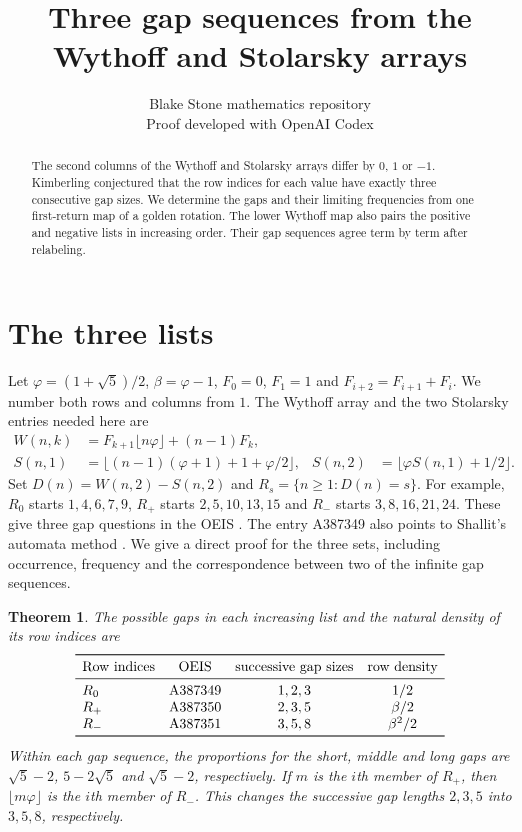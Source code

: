 \documentclass[11pt]{article}
\title{Three gap sequences from the Wythoff and Stolarsky arrays}
\author{Blake Stone mathematics repository\\[-2pt]\small Proof developed with OpenAI Codex}
\date{}
\newtheorem{theorem}{Theorem}
\newcommand{\ph}{\varphi}
\newcommand{\fl}[1]{\lfloor #1\rfloor}
\begin{document}
\maketitle
\begin{abstract}
The second columns of the Wythoff and Stolarsky arrays differ by $0$, $1$ or $-1$.
Kimberling conjectured that the row indices for each value have exactly three
consecutive gap sizes. We determine the gaps and their limiting frequencies
from one first-return map of a golden rotation. The lower Wythoff map also
pairs the positive and negative lists in increasing order. Their gap
sequences agree term by term after relabeling.
\end{abstract}

\section{The three lists}
Let $\ph=(1+\sqrt5)/2$, $\beta=\ph-1$, $F_0=0$, $F_1=1$ and
$F_{i+2}=F_{i+1}+F_i$. We number both rows and columns from $1$.
The Wythoff array and the two Stolarsky entries needed here are
\begin{align*}
 W(n,k)&=F_{k+1}\fl{n\ph}+(n-1)F_k,\\
 S(n,1)&=\fl{(n-1)(\ph+1)+1+\ph/2},&
 S(n,2)&=\fl{\ph S(n,1)+1/2}.
\end{align*}
Set $D(n)=W(n,2)-S(n,2)$ and $R_s=\{n\ge1:D(n)=s\}$.
For example, $R_0$ starts $1,4,6,7,9$,
$R_+$ starts $2,5,10,13,15$ and $R_-$ starts $3,8,16,21,24$.
These give three gap questions in the OEIS \cite{oeis}.
The entry A387349 also points to Shallit's automata method \cite{shallit}.
We give a direct proof for the three sets, including occurrence, frequency and
the correspondence between two of the infinite gap sequences.

\begin{theorem}\label{main}
The possible gaps in each increasing list and the natural density of its row indices are
\[
\begin{array}{lccc}
\toprule
\text{Row indices}&\text{OEIS}&\text{successive gap sizes}&\text{row density}\\
\midrule
R_0 & \mathrm{A387349} & 1,2,3 & 1/2\\
R_+ & \mathrm{A387350} & 2,3,5 & \beta/2\\
R_- & \mathrm{A387351} & 3,5,8 & \beta^2/2\\
\bottomrule
\end{array}
\]
Within each gap sequence, the proportions for the short, middle and long gaps
are $\sqrt5-2$, $5-2\sqrt5$ and $\sqrt5-2$, respectively.
If $m$ is the $i$th member of $R_+$, then $\fl{m\ph}$ is the $i$th
member of $R_-$. This changes the successive gap lengths
$2,3,5$ into $3,5,8$, respectively.
\end{theorem}
\end{document}
